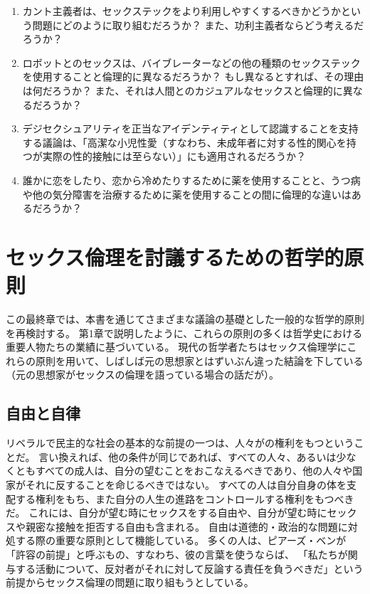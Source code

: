 \documentclass[paper=a4,book,openany]{jlreq}
\begin{document}
\begin{enumerate}
 \item カント主義者は、セックステックをより利用しやすくするべきかどうかという問題にどのように取り組むだろうか？ また、功利主義者ならどう考えるだろうか？
 \item ロボットとのセックスは、バイブレーターなどの他の種類のセックステックを使用することと倫理的に異なるだろうか？ もし異なるとすれば、その理由は何だろうか？ また、それは人間とのカジュアルなセックスと倫理的に異なるだろうか？
 \item デジセクシュアリティを正当なアイデンティティとして認識することを支持する議論は、「高潔な小児性愛（すなわち、未成年者に対する性的関心を持つが実際の性的接触には至らない）」にも適用されるだろうか？
 \item 誰かに恋をしたり、恋から冷めたりするために薬を使用することと、うつ病や他の気分障害を治療するために薬を使用することの間に倫理的な違いはあるだろうか？
\end{enumerate}

\chapter{セックス倫理を討議するための哲学的原則}

この最終章では、本書を通じてさまざまな議論の基礎とした一般的な哲学的原則を再検討する。
第1章で説明したように、これらの原則の多くは哲学史における重要人物たちの業績に基づいている。
現代の哲学者たちはセックス倫理学にこれらの原則を用いて、しばしば元の思想家とはずいぶん違った結論を下している（元の思想家がセックスの倫理を語っている場合の話だが）。

\section{自由と自律}

リベラルで民主的な社会の基本的な前提の一つは、人々がの権利をもつということだ。
言い換えれば、他の条件が同じであれば、すべての人々、あるいは少なくともすべての成人は、自分の望むことをおこなえるべきであり、他の人々や国家がそれに反することを命じるべきではない。
すべての人は自分自身の体を支配する権利をもち、また自分の人生の進路をコントロールする権利をもつべきだ。
これには、自分が望む時にセックスをする自由や、自分が望む時にセックスや親密な接触を拒否する自由も含まれる。
自由は道徳的・政治的な問題に対処する際の重要な原則として機能している。
多くの人は、ピアーズ・ベンが「許容の前提」と呼ぶもの、すなわち、彼の言葉を使うならば、
「私たちが関与する活動について、反対者がそれに対して反論する責任を負うべきだ」\citep[p.237]{benn99:_is_sex_moral_special}という前提からセックス倫理の問題に取り組もうとしている。
\end{document}

